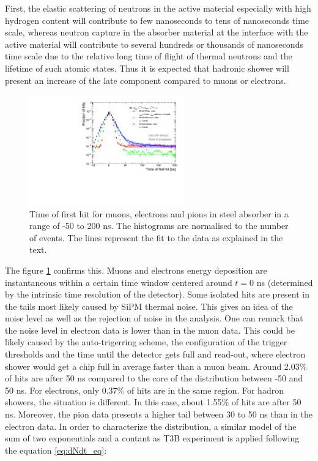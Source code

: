 First, the elastic scattering of neutrons in the active material especially with high hydrogen content will contribute to few nanoseconds to tens of nanoseconds time scale, whereas neutron capture in the absorber material at the interface with the active material will contribute to several hundreds or thousands of nanoseconds time scale due to the relative long time of flight of thermal neutrons and the lifetime of such atomic states. Thus it is expected that hadronic shower will present an increase of the late component compared to muons or electrons.

\begin{figure}[htbp!]
	\centering
	\includegraphics[width=0.6\textwidth]{chap5/fig_AHCAL_timing/Pions/Timing_dNdt_Comparison.pdf}
	\caption{Time of first hit for muons, electrons and pions in steel absorber in a range of -50 to 200 ns. The histograms are normalised to the number of events. The lines represent the fit to the data as explained in the text.}
	\label{fig:dNdt_Comparison}
\end{figure}

The figure \ref{fig:dNdt_Comparison} confirms this. Muons and electrons energy deposition are instantaneous within a certain time window centered around $t=0$ ns (determined by the intrinsic time resolution of the detector). Some isolated hits are present in the tails most likely caused by SiPM thermal noise. This gives an idea of the noise level as well as the rejection of noise in the analysis. One can remark that the noise level in electron data is lower than in the muon data. This could be likely caused by the auto-trigerring scheme, the configuration of the trigger thresholds and the time until the detector gets full and read-out, where electron shower would get a chip full in average faster than a muon beam. Around 2.03\% of hits are after 50 ns compared to the core of the distribution between -50 and 50 ns. For electrons, only 0.37\% of hits are in the same region.
For hadron showers, the situation is different. In this case, about 1.55\% of hits are after 50 ns. Moreover, the pion data presents a higher tail between 30 to 50 ns than in the electron data. In order to characterize the distribution, a similar model of the sum of two exponentials and a contant as T3B experiment \cite{Simon2013} is applied following the equation \ref{eq:dNdt_eq}:

